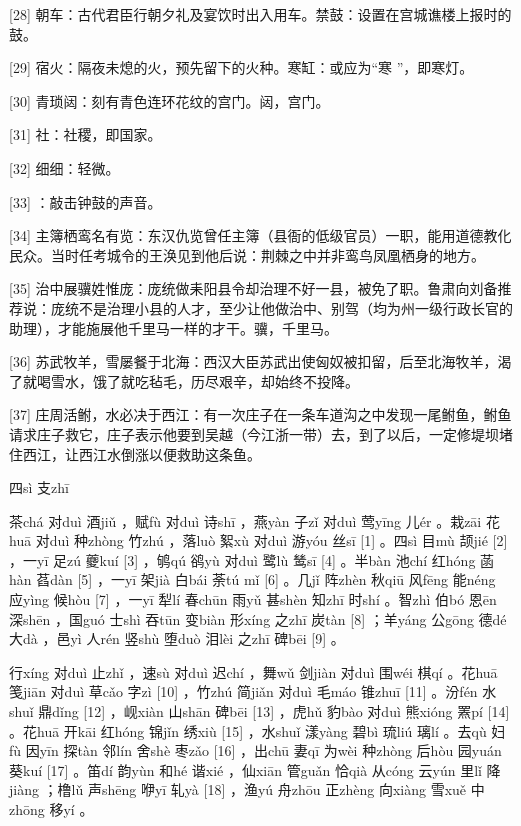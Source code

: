 \documentclass[12pt,UTF8]{ctexbook}
\begin{document}
[28] 朝车：古代君臣行朝夕礼及宴饮时出入用车。禁鼓：设置在宫城谯楼上报时的鼓。

[29] 宿火：隔夜未熄的火，预先留下的火种。寒缸：或应为“寒 ”，即寒灯。

[30] 青琐闼：刻有青色连环花纹的宫门。闼，宫门。

[31] 社：社稷，即国家。

[32] 细细：轻微。

[33] ：敲击钟鼓的声音。

[34] 主簿栖鸾名有览：东汉仇览曾任主簿（县衙的低级官员）一职，能用道德教化民众。当时任考城令的王涣见到他后说：荆棘之中并非鸾鸟凤凰栖身的地方。

[35] 治中展骥姓惟庞：庞统做耒阳县令却治理不好一县，被免了职。鲁肃向刘备推荐说：庞统不是治理小县的人才，至少让他做治中、别驾（均为州一级行政长官的助理），才能施展他千里马一样的才干。骥，千里马。

[36] 苏武牧羊，雪屡餐于北海：西汉大臣苏武出使匈奴被扣留，后至北海牧羊，渴了就喝雪水，饿了就吃毡毛，历尽艰辛，却始终不投降。

[37] 庄周活鲋，水必决于西江：有一次庄子在一条车道沟之中发现一尾鲋鱼，鲋鱼请求庄子救它，庄子表示他要到吴越（今江浙一带）去，到了以后，一定修堤坝堵住西江，让西江水倒涨以便救助这条鱼。





四sì 支zhī


茶chá 对duì 酒jiǔ ，赋fù 对duì 诗shī ，燕yàn 子zǐ 对duì 莺yīng 儿ér 。栽zāi 花huā 对duì 种zhòng 竹zhú ，落luò 絮xù 对duì 游yóu 丝sī [1] 。四sì 目mù 颉jié [2] ，一yī 足zú 夔kuí [3] ，鸲qú 鹆yù 对duì 鹭lù 鸶sī [4] 。半bàn 池chí 红hóng 菡hàn 萏dàn [5] ，一yī 架jià 白bái 荼tú mǐ [6] 。几jǐ 阵zhèn 秋qiū 风fēng 能néng 应yìng 候hòu [7] ，一yī 犁lí 春chūn 雨yǔ 甚shèn 知zhī 时shí 。智zhì 伯bó 恩ēn 深shēn ，国guó 士shì 吞tūn 变biàn 形xíng 之zhī 炭tàn [8] ；羊yáng 公gōng 德dé 大dà ，邑yì 人rén 竖shù 堕duò 泪lèi 之zhī 碑bēi [9] 。

行xíng 对duì 止zhǐ ，速sù 对duì 迟chí ，舞wǔ 剑jiàn 对duì 围wéi 棋qí 。花huā 笺jiān 对duì 草cǎo 字zì [10] ，竹zhú 简jiǎn 对duì 毛máo 锥zhuī [11] 。汾fén 水shuǐ 鼎dǐng [12] ，岘xiàn 山shān 碑bēi [13] ，虎hǔ 豹bào 对duì 熊xióng 罴pí [14] 。花huā 开kāi 红hóng 锦jǐn 绣xiù [15] ，水shuǐ 漾yàng 碧bì 琉liú 璃lí 。去qù 妇fù 因yīn 探tàn 邻lín 舍shè 枣zǎo [16] ，出chū 妻qī 为wèi 种zhòng 后hòu 园yuán 葵kuí [17] 。笛dí 韵yùn 和hé 谐xié ，仙xiān 管guǎn 恰qià 从cóng 云yún 里lǐ 降jiàng ；橹lǔ 声shēng 咿yī 轧yà [18] ，渔yú 舟zhōu 正zhèng 向xiàng 雪xuě 中zhōng 移yí 。
\end{document}

